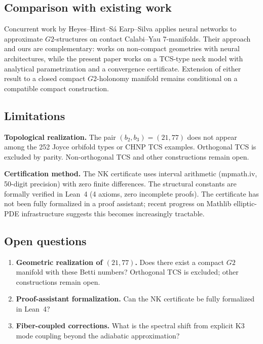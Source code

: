 \documentclass[11pt,a4paper]{article}
\theoremstyle{definition}
\theoremstyle{remark}
\newcommand{\Gtwo}{\mathrm{G}_2}
\def\Gtwo{G2}%
\begin{document}
\subsection{Comparison with existing work}

Concurrent work by Heyes--Hirst--S\'a Earp--Silva \cite{HeyesHirst2026} applies neural networks to approximate $\Gtwo$-structures on contact Calabi--Yau 7-manifolds. Their approach and ours are complementary: \cite{HeyesHirst2026} works on non-compact geometries with neural architectures, while the present paper works on a TCS-type neck model with analytical parametrization and a convergence certificate. Extension of either result to a closed compact $\Gtwo$-holonomy manifold remains conditional on a compatible compact construction.

\subsection{Limitations}

\textbf{Topological realization.} The pair $(b_2, b_3) = (21, 77)$ does not appear among the 252 Joyce orbifold types or CHNP TCS examples. Orthogonal TCS is excluded by parity. Non-orthogonal TCS and other constructions remain open.

\textbf{Certification method.} The NK certificate uses interval arithmetic (mpmath.iv, 50-digit precision) with zero finite differences. The structural constants are formally verified in Lean~4 (4 axioms, zero incomplete proofs). The certificate has not been fully formalized in a proof assistant; recent progress on Mathlib elliptic-PDE infrastructure \cite{DGNMLean2026} suggests this becomes increasingly tractable.

\subsection{Open questions}

\begin{enumerate}
\item \textbf{Geometric realization of $(21, 77)$.} Does there exist a compact $\Gtwo$ manifold with these Betti numbers? Orthogonal TCS is excluded; other constructions remain open.
\item \textbf{Proof-assistant formalization.} Can the NK certificate be fully formalized in Lean~4?
\item \textbf{Fiber-coupled corrections.} What is the spectral shift from explicit K3 mode coupling beyond the adiabatic approximation?
\end{enumerate}
\end{document}
